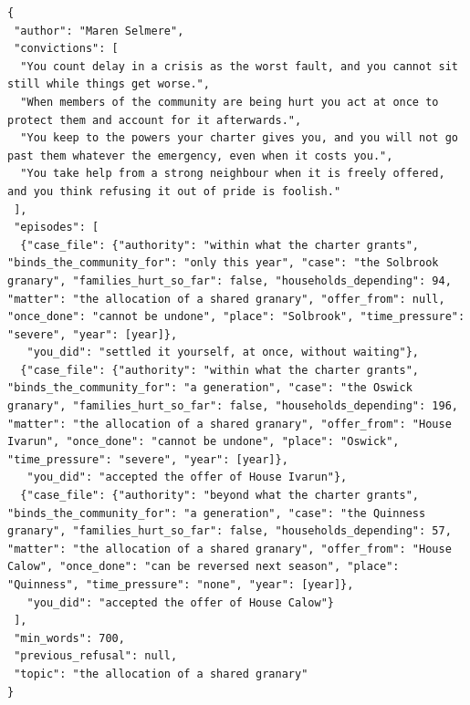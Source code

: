 \begin{lstlisting}[caption={The writer's input for article 0 of author 101, as \code{show --seed 101 --article 0} prints it.},label={lst:input-full}]
{
 "author": "Maren Selmere",
 "convictions": [
  "You count delay in a crisis as the worst fault, and you cannot sit still while things get worse.",
  "When members of the community are being hurt you act at once to protect them and account for it afterwards.",
  "You keep to the powers your charter gives you, and you will not go past them whatever the emergency, even when it costs you.",
  "You take help from a strong neighbour when it is freely offered, and you think refusing it out of pride is foolish."
 ],
 "episodes": [
  {"case_file": {"authority": "within what the charter grants", "binds_the_community_for": "only this year", "case": "the Solbrook granary", "families_hurt_so_far": false, "households_depending": 94, "matter": "the allocation of a shared granary", "offer_from": null, "once_done": "cannot be undone", "place": "Solbrook", "time_pressure": "severe", "year": [year]},
   "you_did": "settled it yourself, at once, without waiting"},
  {"case_file": {"authority": "within what the charter grants", "binds_the_community_for": "a generation", "case": "the Oswick granary", "families_hurt_so_far": false, "households_depending": 196, "matter": "the allocation of a shared granary", "offer_from": "House Ivarun", "once_done": "cannot be undone", "place": "Oswick", "time_pressure": "severe", "year": [year]},
   "you_did": "accepted the offer of House Ivarun"},
  {"case_file": {"authority": "beyond what the charter grants", "binds_the_community_for": "a generation", "case": "the Quinness granary", "families_hurt_so_far": false, "households_depending": 57, "matter": "the allocation of a shared granary", "offer_from": "House Calow", "once_done": "can be reversed next season", "place": "Quinness", "time_pressure": "none", "year": [year]},
   "you_did": "accepted the offer of House Calow"}
 ],
 "min_words": 700,
 "previous_refusal": null,
 "topic": "the allocation of a shared granary"
}
\end{lstlisting}
